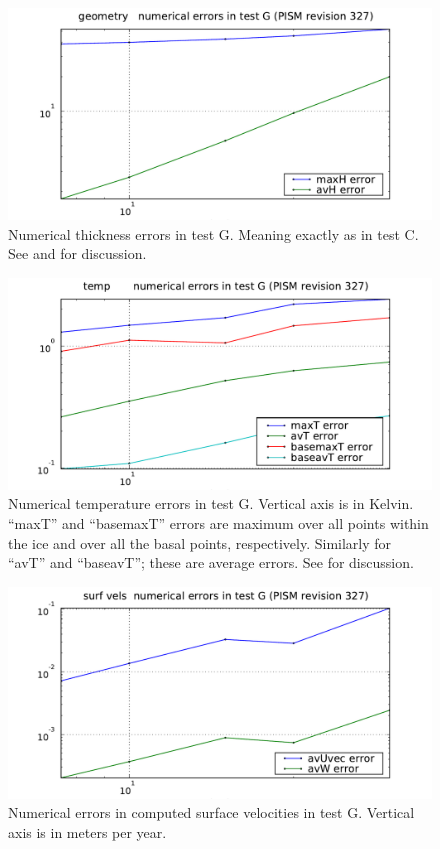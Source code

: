 \documentclass[11pt,final]{amsart}
\begin{document}
\begin{figure}[ht]
\includegraphics[width=4.8in,keepaspectratio=true]{figs/thickerrs_G}
\caption{Numerical thickness errors in test G.  Meaning exactly as in test C.  See \cite{BBL} and \cite{BLKCB} for discussion.}
\label{fig:thickerrsG}
\end{figure}

\begin{figure}[ht]
\includegraphics[width=4.8in,keepaspectratio=true]{figs/temperrs_G}
\caption{Numerical temperature errors in test G.  Vertical axis is in Kelvin.  ``maxT'' and ``basemaxT'' errors are maximum over all points within the ice and over all the basal points, respectively.  Similarly for ``avT'' and ``baseavT''; these are average errors.  See \cite{BBL} for discussion.}
\label{fig:temperrsG}
\end{figure}

\begin{figure}[ht]
\includegraphics[width=4.8in,keepaspectratio=true]{figs/surfvelerrs_G}
\caption{Numerical errors in computed surface velocities in test G.  Vertical axis is in meters per year.}
\label{fig:surfvelerrsG}
\end{figure}
\end{document}
